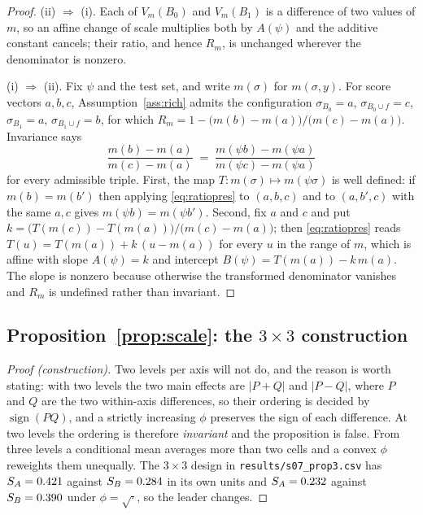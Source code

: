 \begin{proof}
(ii) $\Rightarrow$ (i). Each of $V_m(B_0)$ and $V_m(B_1)$ is a difference of
two values of $m$, so an affine change of scale multiplies both by $A(\psi)$
and the additive constant cancels; their ratio, and hence $R_m$, is unchanged
wherever the denominator is nonzero.

(i) $\Rightarrow$ (ii). Fix $\psi$ and the test set, and write $m(\sigma)$ for
$m(\sigma,y)$. For score vectors $a, b, c$, Assumption~\ref{ass:rich} admits
the configuration
$\sigma_{B_0} = a$, $\sigma_{B_0 \cup f} = c$, $\sigma_{B_1} = a$,
$\sigma_{B_1 \cup f} = b$, for which
$R_m = 1 - \bigl(m(b) - m(a)\bigr)/\bigl(m(c) - m(a)\bigr)$. Invariance says
\begin{equation}
\label{eq:ratiopres}
\frac{m(b) - m(a)}{m(c) - m(a)}
\;=\;
\frac{m(\psi b) - m(\psi a)}{m(\psi c) - m(\psi a)}
\end{equation}
for every admissible triple. First, the map $T : m(\sigma) \mapsto
m(\psi\sigma)$ is well defined: if $m(b) = m(b')$ then applying
\eqref{eq:ratiopres} to $(a,b,c)$ and to $(a,b',c)$ with the same $a,c$ gives
$m(\psi b) = m(\psi b')$. Second, fix $a$ and $c$ and put
$k = \bigl(T(m(c)) - T(m(a))\bigr)/\bigl(m(c) - m(a)\bigr)$; then
\eqref{eq:ratiopres} reads $T(u) = T(m(a)) + k\,(u - m(a))$ for every
$u$ in the range of $m$, which is affine with slope $A(\psi) = k$ and
intercept $B(\psi) = T(m(a)) - k\,m(a)$. The slope is nonzero because
otherwise the transformed denominator vanishes and $R_m$ is undefined rather
than invariant.
\end{proof}

\subsection*{Proposition~\ref{prop:scale}: the $3\times 3$ construction}

\begin{proof}[Proof (construction)]
Two levels per axis will not do, and the reason is worth stating: with two
levels the two main effects are $|P+Q|$ and $|P-Q|$, where $P$ and $Q$ are the
two within-axis differences, so their ordering is decided by
$\operatorname{sign}(PQ)$, and a strictly increasing $\phi$ preserves the sign
of each difference. At two levels the ordering is therefore \emph{invariant}
and the proposition is false. From three levels a conditional mean averages
more than two cells and a convex $\phi$ reweights them unequally. The
$3 \times 3$ design in \texttt{results/s07\_prop3.csv} has
$S_A = 0.421$ against $S_B = 0.284$ in its own units and
$S_A = 0.232$ against $S_B = 0.390$ under $\phi = \sqrt{\cdot}$,
so the leader changes.
\end{proof}

